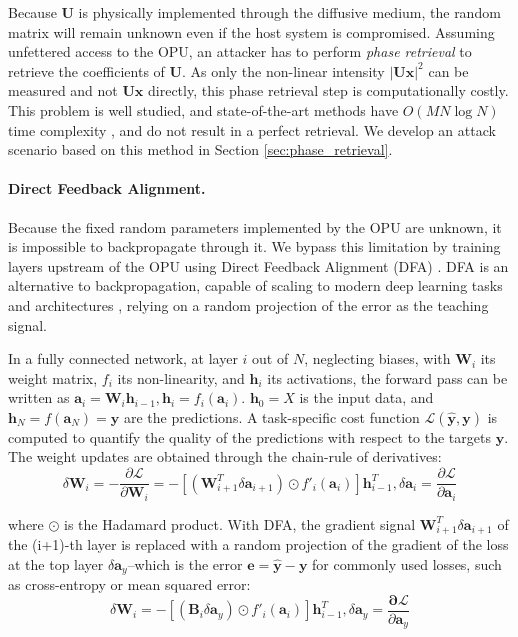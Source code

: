 Because $\mathbf{U}$ is physically implemented through the diffusive medium, the random matrix will remain unknown even if the host system is compromised. Assuming unfettered access to the OPU, an attacker has to perform \emph{phase retrieval} to retrieve the coefficients of $\mathbf{U}$. As only the non-linear intensity $\lvert\mathbf{Ux}\rvert^2$ can be measured and not $\mathbf{Ux}$ directly, this phase retrieval step is computationally costly. This problem is well studied, and state-of-the-art methods have $O(MN\log N)$ time complexity \cite{Gupta2020FastOS}, and do not result in a perfect retrieval. We develop an attack scenario based on this method in Section \ref{sec:phase_retrieval}.

\paragraph{Direct Feedback Alignment.} Because the fixed random parameters implemented by the OPU are unknown, it is impossible to backpropagate through it. We bypass this limitation by training layers upstream of the OPU using Direct Feedback Alignment (DFA) \cite{Nkland2016DirectFA}. DFA is an alternative to backpropagation, capable of scaling to modern deep learning tasks and architectures \cite{Launay2020DirectFA}, relying on a random projection of the error as the teaching signal.

In a fully connected network, at layer $i$ out of $N$, neglecting biases, with $\mathbf{W}_i$ its weight matrix, $f_i$ its non-linearity, and $\mathbf{h}_i$ its activations, the forward pass can be written as $\mathbf{a}_i = \mathbf{W}_i \mathbf{h}_{i - 1}, \mathbf{h}_i = f_i(\mathbf{a}_i)$.
$\mathbf{h}_0 = X$ is the input data, and $\mathbf{h}_N = f(\mathbf{a}_N) = \mathbf{\hat{y}}$ are the predictions.  A task-specific cost function $\mathcal{L}(\mathbf{\hat{y}}, \mathbf{y})$ is computed to quantify the quality of the predictions with respect to the targets $\mathbf{y}$. The weight updates are obtained through the chain-rule of derivatives: 
\begin{equation}
    \delta \mathbf{W}_i = - \frac{\partial \mathcal{L}}{\partial \mathbf{W}_i} = - [(\mathbf{W}_{i+1}^{T} \delta \mathbf{a}_{i+1})\odot f'_i(\mathbf{a}_i)] \mathbf{h}_{i-1}^{T}, \delta \mathbf{a}_i = \frac{\partial \mathcal{L}}{\partial \mathbf{a}_i}
\end{equation}

where $\odot$ is the Hadamard product. With DFA, the gradient signal $\mathbf{W}_{i+1}^{T}\delta \mathbf{a}_{i + 1}$ of the (i+1)-th layer is replaced with a random projection of the gradient of the loss at the top layer $\delta \mathbf{a}_y$--which is the error $\mathbf{e} = \mathbf{\hat{y}} - \mathbf{y}$ for commonly used losses, such as cross-entropy or mean squared error: 
\begin{equation}
    \delta \mathbf{W}_i = - [(\mathbf{B}_i\delta \mathbf{a}_y) \odot f'_i(\mathbf{a}_i)] \mathbf{h}_{i-1}^T, \delta \mathbf{a}_y = \frac{\mathbf{\partial \mathcal{L}}}{\partial \mathbf{a}_y}
\end{equation}

